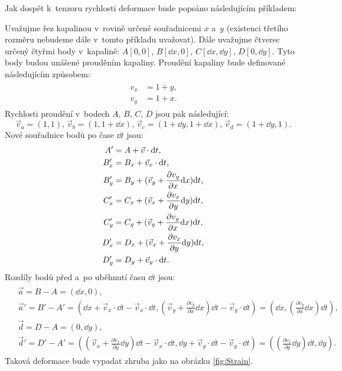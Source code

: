 \documentclass[12pt]{article}
\begin{document}
Jak dospět k~tenzoru rychlosti deformace bude popsáno následujícím příkladem:
\par \noindent
Uvažujme řez kapalinou v~rovině určené souřadnicemi $x$ a~$y$ (existenci třetího rozměru nebudeme dále v~tomto příkladu uvažovat). Dále uvažujme čtverec určený čtyřmi body v~kapalině: $A[0,0]$, $B[\dd x,0]$, $C[\dd x,\dd y]$, $D[0,\dd y]$. Tyto body budou unášené prouděním kapaliny. Proudění kapaliny bude definované následujícím způsobem:
\begin{align}
    \begin{split}
        v_x &= 1 + y\text{,} \\
        v_y &= 1 + x\text{.}
    \end{split}
\end{align}
Rychlosti proudění v~bodech $A$, $B$, $C$, $D$ jsou pak následující:
\begin{equation}
    \vec{v}_a = (1,1)\text{,} \;
    \vec{v}_b = (1,1 + \dd x)\text{,} \;
    \vec{v}_c = (1 + \dd y,1 + \dd x)\text{,} \;
    \vec{v}_d = (1 + \dd y,1)\text{.}
\end{equation}
Nové souřadnice bodů po čase $\dd t$ jsou:
\begin{align}
    \begin{split}
        A' &= A + \vec{v}\cdot \dd t\emph{,}\\
        B'_x &= B_x + \vec{v}_x \cdot \dd t\emph{,}\\
        B'_y &= B_y + (\vec{v}_y + \frac{\partial v_y}{\partial x}\dd x) \dd t\emph{,}\\
        C'_x &= C_x + (\vec{v}_x + \frac{\partial v_x}{\partial y}\dd y) \dd t\emph{,}\\
        C'_y &= C_y + (\vec{v}_y + \frac{\partial v_y}{\partial x}\dd x) \dd t\emph{,}\\
        D'_x &= D_x + (\vec{v}_x + \frac{\partial v_x}{\partial y}\dd y) \dd t\emph{,}\\
        D'_y &= D_y + \vec{v}_y \cdot \dd t \emph{.}
    \end{split}
\end{align}
Rozdíly bodů před a~po uběhnutí času $\dd t$ jsou:
\begin{align}
    \begin{split}
        &\vec{a} = B-A = (\dd x,0)\text{,}\\
        &\vec{a}' = B'-A' = \left(\dd x + \vec{v}_x \cdot \dd t - \vec{v}_x \cdot \dd t, \left(\vec{v}_y + \frac{\partial v_y}{\partial x}\dd x\right)\dd t - \vec{v}_y \cdot \dd t\right) = \left(\dd x, \left(\frac{\partial v_y}{\partial x}\dd x\right)\dd t\right)\text{,}\\
        &\vec{d} = D-A = (0,\dd y)\text{,}\\
        &\vec{d}' = D'-A' = \left(\left(\vec{v}_x + \frac{\partial v_x}{\partial y}\dd y\right) \dd t - \vec{v}_x\cdot \dd t, \dd y + \vec{v}_y \cdot \dd t - \vec{v}_y\cdot \dd t\right) = \left(\left(\frac{\partial v_x}{\partial y}\dd y\right)\dd t,\dd y\right)\text{.}
    \end{split}
\end{align}
Taková deformace bude vypadat zhruba jako na obrázku \ref{fig:Strain}.
\end{document}
